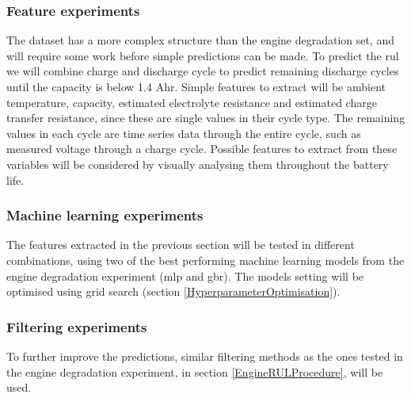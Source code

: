 \documentclass[english, a4paper]{report}
\begin{document}
{{{            \subsubsection{Feature experiments}
            {
                The dataset has a more complex structure than the engine degradation set, and will require some work before simple predictions can be made. To predict the \gls{rul} we will combine charge and discharge cycle to predict remaining discharge cycles until the capacity is below 1.4 Ahr. Simple features to extract will be ambient temperature, capacity, estimated electrolyte resistance and estimated charge transfer resistance, since these are single values in their cycle type. The remaining values in each cycle are time series data through the entire cycle, such as measured voltage through a charge cycle. Possible features to extract from these variables will be considered by visually analysing them throughout the battery life. 
            }
            
            \subsubsection{Machine learning experiments}\label{BatteryMLChap3}
            {
                The features extracted in the previous section will be tested in different combinations, using two of the best performing machine learning models from the engine degradation experiment (\gls{mlp} and \gls{gbr}). The models setting will be optimised using grid search (section \ref{HyperparameterOptimisation}). 
            }
            
            \subsubsection{Filtering experiments}
            {
                To further improve the predictions, similar filtering methods as the ones tested in the engine degradation experiment, in section \ref{EngineRULProcedure}, will be used.
            }
        }
    }
    
}
\end{document}
